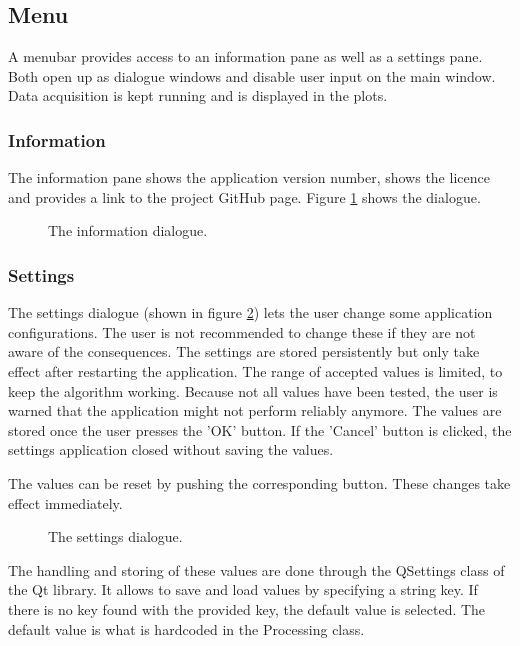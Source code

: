 \subsection{Menu}
A menubar provides access to an information pane as well as a settings pane. Both open up as dialogue windows and disable user input on the main window. Data acquisition is kept running and is displayed in the plots.

\subsubsection{Information}
The information pane shows the application version number, shows the licence and provides a link to the project GitHub page. Figure \ref{fig:UIinfo} shows the dialogue.

\begin{figure}[ht]
\centering
\caption{The information dialogue.}
\label{fig:UIinfo}
\end{figure}


\subsubsection{Settings}
The settings dialogue (shown in figure \ref{fig:UIsettings}) lets the user change some application configurations. The user is not recommended to change these if they are not aware of the consequences. The settings are stored persistently but only take effect after restarting the application. The range of accepted values is limited, to keep the algorithm working. Because not all values have been tested, the user is warned that the application might not perform reliably anymore. The values are stored once the user presses the 'OK' button. If the 'Cancel' button is clicked, the settings application closed without saving the values.

The values can be reset by pushing the corresponding button. These changes take effect immediately. 

\begin{figure}[ht]
\centering
\caption{The settings dialogue.}
\label{fig:UIsettings}
\end{figure}

The handling and storing of these values are done through the QSettings class of the Qt library. It allows to save and load values by specifying a string key. If there is no key found with the provided key, the default value is selected. The default value is what is hardcoded in the Processing class.

